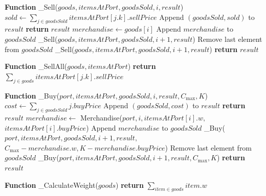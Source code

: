 \documentclass[12pt, a4paper]{article}
\begin{document}
\begin{algorithmic}[1]
\STATE

\STATE \textbf{Function} \_Sell($goods, itemsAtPort, goodsSold, i, result$)
    \STATE $sold \gets \sum_{j \in goodsSold} itemsAtPort[j.k].sellPrice$
    \STATE Append $(goodsSold, sold)$ to $result$
    \STATE \textbf{return} $result$
\ENDIF
\STATE $merchandise \gets goods[i]$
\STATE Append $merchandise$ to $goodsSold$
\STATE \_Sell($goods, itemsAtPort, goodsSold, i+1, result$)
\STATE Remove last element from $goodsSold$
\STATE \_Sell($goods, itemsAtPort, goodsSold, i+1, result$)
\STATE \textbf{return} $result$

\STATE

\STATE \textbf{Function} \_SellAll($goods, itemsAtPort$)
\STATE \textbf{return} $\sum_{j \in goods} itemsAtPort[j.k].sellPrice$

\STATE

\STATE \textbf{Function} \_Buy($port, itemsAtPort, goodsSold, i, result, C_{\max}, K$)
    \STATE $cost \gets \sum_{j \in goodsSold} j.buyPrice$
    \STATE Append $(goodsSold, cost)$ to $result$
    \STATE \textbf{return} $result$
\ENDIF
\STATE $merchandise \gets$ Merchandise($port, i, itemsAtPort[i].w,$
\STATE \hspace{1cm} $itemsAtPort[i].buyPrice$)
    \STATE Append $merchandise$ to $goodsSold$
    \STATE \_Buy($port, itemsAtPort, goodsSold, i+1, result,$
    \STATE \hspace{1cm} $C_{\max}-merchandise.w, K-merchandise.buyPrice$)
    \STATE Remove last element from $goodsSold$
\ENDIF
\STATE \_Buy($port, itemsAtPort, goodsSold, i+1, result, C_{\max}, K$)
\STATE \textbf{return} $result$

\STATE

\STATE \textbf{Function} \_CalculateWeight($goods$)
\STATE \textbf{return} $\sum_{item \in goods} item.w$

\end{algorithmic}

\
\end{document}
